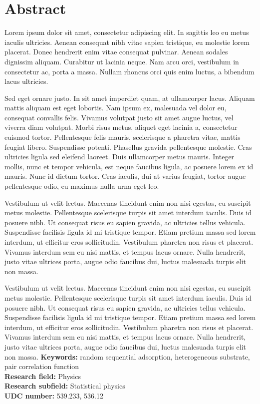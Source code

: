 
\normalsize

\chapter{Abstract}


Lorem ipsum dolor sit amet, consectetur adipiscing elit. In sagittis leo eu metus iaculis ultricies. Aenean consequat nibh vitae sapien tristique, eu molestie lorem placerat. Donec hendrerit enim vitae consequat pulvinar. Aenean sodales dignissim aliquam. Curabitur ut lacinia neque. Nam arcu orci, vestibulum in consectetur ac, porta a massa. Nullam rhoncus orci quis enim luctus, a bibendum lacus ultricies.

Sed eget ornare justo. In sit amet imperdiet quam, at ullamcorper lacus. Aliquam mattis aliquam est eget lobortis. Nam ipsum ex, malesuada vel dolor eu, consequat convallis felis. Vivamus volutpat justo sit amet augue luctus, vel viverra diam volutpat. Morbi risus metus, aliquet eget lacinia a, consectetur euismod tortor. Pellentesque felis mauris, scelerisque a pharetra vitae, mattis feugiat libero. Suspendisse potenti. Phasellus gravida pellentesque molestie. Cras ultricies ligula sed eleifend laoreet. Duis ullamcorper metus mauris. Integer mollis, nunc et tempor vehicula, est neque faucibus ligula, ac posuere lorem ex id mauris. Nunc id dictum tortor. Cras iaculis, dui at varius feugiat, tortor augue pellentesque odio, eu maximus nulla urna eget leo.

Vestibulum ut velit lectus. Maecenas tincidunt enim non nisi egestas, eu suscipit metus molestie. Pellentesque scelerisque turpis sit amet interdum iaculis. Duis id posuere nibh. Ut consequat risus eu sapien gravida, ac ultricies tellus vehicula. Suspendisse facilisis ligula id mi tristique tempor. Etiam pretium massa sed lorem interdum, ut efficitur eros sollicitudin. Vestibulum pharetra non risus et placerat. Vivamus interdum sem eu nisi mattis, et tempus lacus ornare. Nulla hendrerit, justo vitae ultrices porta, augue odio faucibus dui, luctus malesuada turpis elit non massa.


Vestibulum ut velit lectus. Maecenas tincidunt enim non nisi egestas, eu suscipit metus molestie. Pellentesque scelerisque turpis sit amet interdum iaculis. Duis id posuere nibh. Ut consequat risus eu sapien gravida, ac ultricies tellus vehicula. Suspendisse facilisis ligula id mi tristique tempor. Etiam pretium massa sed lorem interdum, ut efficitur eros sollicitudin. Vestibulum pharetra non risus et placerat. Vivamus interdum sem eu nisi mattis, et tempus lacus ornare. Nulla hendrerit, justo vitae ultrices porta, augue odio faucibus dui, luctus malesuada turpis elit non massa.
\noindent
{\textbf {Keywords:}} random sequential adsorption, heterogeneous substrate, pair
correlation function\\
{\textbf {Research field:}} Physics \\
{\textbf {Research subfield:}} Statistical physics\\
\textbf{UDC number:} 539.233, 536.12

\hfill

\justify
